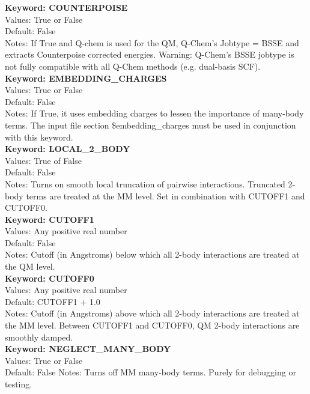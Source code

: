 \documentclass[11pt,letterpaper]{article}
\begin{document}
\begin{spacing}{1.0}
\noindent
\textbf{Keyword: COUNTERPOISE} \\
Values:  True or False  \\
Default: False \\
Notes:   If True and Q-chem is used for the QM, 
         Q-Chem's Jobtype = BSSE and extracts Counterpoise
	 corrected energies.  Warning: Q-Chem's BSSE jobtype is not fully
	 compatible with all Q-Chem methods (e.g. dual-basis SCF). \\

\noindent
\textbf{Keyword: EMBEDDING\_CHARGES} \\
Values:  True or False  \\
Default: False \\
Notes:   If True, it uses embedding charges to lessen the importance of 
many-body
	 terms.  The input file section \$embedding\_charges must be used in 
	 conjunction with this keyword. \\

\noindent
\textbf{Keyword: LOCAL\_2\_BODY} \\
Values:  True of False \\
Default: False \\
Notes:   Turns on smooth local truncation of pairwise interactions.  Truncated
	 2-body terms are treated at the MM level.  Set in combination with
         CUTOFF1 and CUTOFF0. \\

\noindent
\textbf{Keyword: CUTOFF1} \\
Values:  Any positive real number \\
Default: False \\
Notes:   Cutoff (in Angstroms) below which all 2-body interactions are treated 
	 at the QM level. \\

\noindent
\textbf{Keyword: CUTOFF0} \\
Values:  Any positive real number \\
Default: CUTOFF1 + 1.0  \\
Notes:   Cutoff (in Angstroms) above which all 2-body interactions are treated 
	 at the MM level.  Between CUTOFF1 and CUTOFF0, QM 2-body interactions 
	 are smoothly damped. \\
 
\noindent 
\textbf{Keyword: NEGLECT\_MANY\_BODY} \\
Values:  True or False \\
Default: False
Notes:   Turns off MM many-body terms.  Purely for debugging or testing. \\


\end{spacing}
\end{document}
